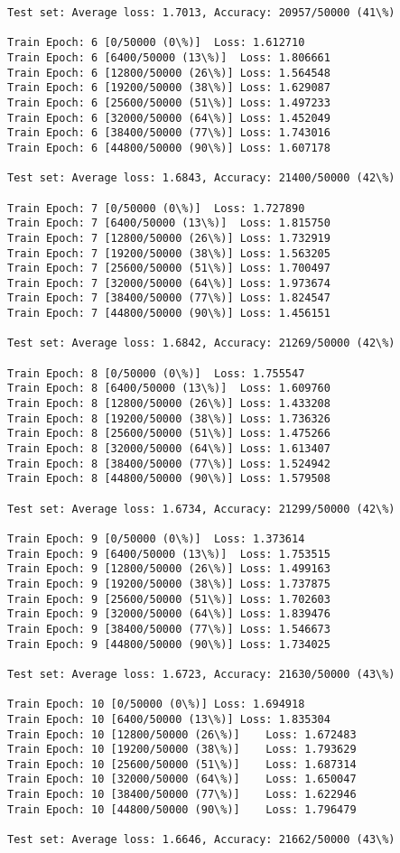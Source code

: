 \documentclass[11pt]{article}
\begin{document}
\begin{Verbatim}[commandchars=\\\{\}]
Test set: Average loss: 1.7013, Accuracy: 20957/50000 (41\%)

Train Epoch: 6 [0/50000 (0\%)]	Loss: 1.612710
Train Epoch: 6 [6400/50000 (13\%)]	Loss: 1.806661
Train Epoch: 6 [12800/50000 (26\%)]	Loss: 1.564548
Train Epoch: 6 [19200/50000 (38\%)]	Loss: 1.629087
Train Epoch: 6 [25600/50000 (51\%)]	Loss: 1.497233
Train Epoch: 6 [32000/50000 (64\%)]	Loss: 1.452049
Train Epoch: 6 [38400/50000 (77\%)]	Loss: 1.743016
Train Epoch: 6 [44800/50000 (90\%)]	Loss: 1.607178

Test set: Average loss: 1.6843, Accuracy: 21400/50000 (42\%)

Train Epoch: 7 [0/50000 (0\%)]	Loss: 1.727890
Train Epoch: 7 [6400/50000 (13\%)]	Loss: 1.815750
Train Epoch: 7 [12800/50000 (26\%)]	Loss: 1.732919
Train Epoch: 7 [19200/50000 (38\%)]	Loss: 1.563205
Train Epoch: 7 [25600/50000 (51\%)]	Loss: 1.700497
Train Epoch: 7 [32000/50000 (64\%)]	Loss: 1.973674
Train Epoch: 7 [38400/50000 (77\%)]	Loss: 1.824547
Train Epoch: 7 [44800/50000 (90\%)]	Loss: 1.456151

Test set: Average loss: 1.6842, Accuracy: 21269/50000 (42\%)

Train Epoch: 8 [0/50000 (0\%)]	Loss: 1.755547
Train Epoch: 8 [6400/50000 (13\%)]	Loss: 1.609760
Train Epoch: 8 [12800/50000 (26\%)]	Loss: 1.433208
Train Epoch: 8 [19200/50000 (38\%)]	Loss: 1.736326
Train Epoch: 8 [25600/50000 (51\%)]	Loss: 1.475266
Train Epoch: 8 [32000/50000 (64\%)]	Loss: 1.613407
Train Epoch: 8 [38400/50000 (77\%)]	Loss: 1.524942
Train Epoch: 8 [44800/50000 (90\%)]	Loss: 1.579508

Test set: Average loss: 1.6734, Accuracy: 21299/50000 (42\%)

Train Epoch: 9 [0/50000 (0\%)]	Loss: 1.373614
Train Epoch: 9 [6400/50000 (13\%)]	Loss: 1.753515
Train Epoch: 9 [12800/50000 (26\%)]	Loss: 1.499163
Train Epoch: 9 [19200/50000 (38\%)]	Loss: 1.737875
Train Epoch: 9 [25600/50000 (51\%)]	Loss: 1.702603
Train Epoch: 9 [32000/50000 (64\%)]	Loss: 1.839476
Train Epoch: 9 [38400/50000 (77\%)]	Loss: 1.546673
Train Epoch: 9 [44800/50000 (90\%)]	Loss: 1.734025

Test set: Average loss: 1.6723, Accuracy: 21630/50000 (43\%)

Train Epoch: 10 [0/50000 (0\%)]	Loss: 1.694918
Train Epoch: 10 [6400/50000 (13\%)]	Loss: 1.835304
Train Epoch: 10 [12800/50000 (26\%)]	Loss: 1.672483
Train Epoch: 10 [19200/50000 (38\%)]	Loss: 1.793629
Train Epoch: 10 [25600/50000 (51\%)]	Loss: 1.687314
Train Epoch: 10 [32000/50000 (64\%)]	Loss: 1.650047
Train Epoch: 10 [38400/50000 (77\%)]	Loss: 1.622946
Train Epoch: 10 [44800/50000 (90\%)]	Loss: 1.796479

Test set: Average loss: 1.6646, Accuracy: 21662/50000 (43\%)


    \end{Verbatim}
\end{document}
